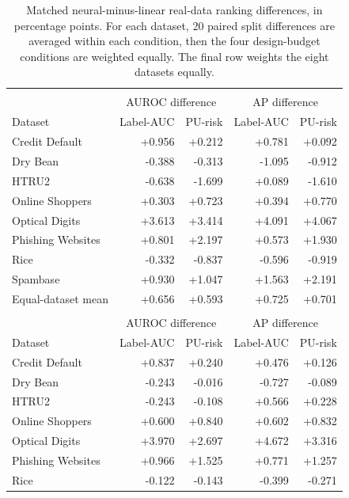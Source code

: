 \begin{table}[t]
\centering
\caption{Matched neural-minus-linear real-data ranking differences, in percentage points. For each dataset, 20 paired split differences are averaged within each condition, then the four design-budget conditions are weighted equally. The final row weights the eight datasets equally.}
\label{tab:s-real-neural}
\small
\setlength{\tabcolsep}{3.5pt}
\renewcommand{\arraystretch}{1.08}
\begin{tabularx}{\textwidth}{>{\raggedright\arraybackslash}Xrrrr}
\toprule
\multicolumn{5}{l}{\textbf{uPU}}\\
& \multicolumn{2}{c}{AUROC difference} & \multicolumn{2}{c}{AP difference}\\
Dataset & Label-AUC & PU-risk & Label-AUC & PU-risk\\
\midrule
Credit Default & +0.956 & +0.212 & +0.781 & +0.092 \\
Dry Bean & -0.388 & -0.313 & -1.095 & -0.912 \\
HTRU2 & -0.638 & -1.699 & +0.089 & -1.610 \\
Online Shoppers & +0.303 & +0.723 & +0.394 & +0.770 \\
Optical Digits & +3.613 & +3.414 & +4.091 & +4.067 \\
Phishing Websites & +0.801 & +2.197 & +0.573 & +1.930 \\
Rice & -0.332 & -0.837 & -0.596 & -0.919 \\
Spambase & +0.930 & +1.047 & +1.563 & +2.191 \\
Equal-dataset mean & +0.656 & +0.593 & +0.725 & +0.701 \\
\midrule
\multicolumn{5}{l}{\textbf{nnPU}}\\
& \multicolumn{2}{c}{AUROC difference} & \multicolumn{2}{c}{AP difference}\\
Dataset & Label-AUC & PU-risk & Label-AUC & PU-risk\\
\midrule
Credit Default & +0.837 & +0.240 & +0.476 & +0.126 \\
Dry Bean & -0.243 & -0.016 & -0.727 & -0.089 \\
HTRU2 & -0.243 & -0.108 & +0.566 & +0.228 \\
Online Shoppers & +0.600 & +0.840 & +0.602 & +0.832 \\
Optical Digits & +3.970 & +2.697 & +4.672 & +3.316 \\
Phishing Websites & +0.966 & +1.525 & +0.771 & +1.257 \\
Rice & -0.122 & -0.143 & -0.399 & -0.271 \\

\end{tabularx}
\end{table}
